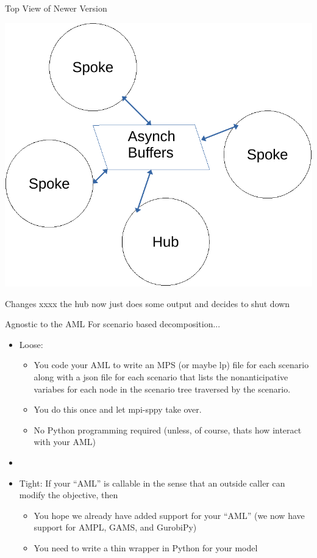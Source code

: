 \documentclass[9pt,usenames,dvipsnames]{beamer}
\begin{document}
\begin{frame}{Top View of Newer Version}

\includegraphics[width=1.0\linewidth]{topview.pdf}

\end{frame}

\begin{frame}{Changes}
xxxx the hub now just does some output and decides to shut down
\end{frame}



\begin{frame}{Agnostic to the AML}
  For scenario based decomposition...
  \begin{itemize}
  \item Loose:
    \begin{itemize}
    \item You code your AML to write an MPS (or maybe lp) file for each scenario along with a json file for each scenario that lists the nonanticipative variabes for each node in the scenario tree traversed by the scenario.
    \item You do this once and let mpi-sppy take over.
      \item No Python programming required (unless, of course, thats how interact with your AML)
      \end{itemize}
    \item[]
    \item Tight: If your ``AML'' is callable in the sense that an outside caller
      can modify the objective, then
      \begin{itemize}
      \item You hope we already have added support for your ``AML'' (we now have support for AMPL, GAMS, and GurobiPy)
        \item You need to write a thin wrapper in Python for your model
        \end{itemize}
  \end{itemize}
\end{frame}
\end{document}
